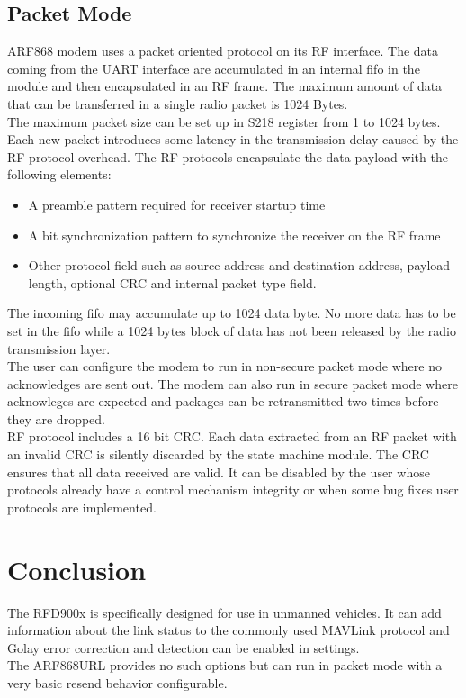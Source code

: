 \subsection{Packet Mode}
ARF868 modem uses a packet oriented protocol on its RF interface. The data coming from the UART interface are accumulated in an internal fifo in the module and then encapsulated in an RF frame. The maximum amount of data that can be transferred in a single radio packet is 1024 Bytes.\\
The maximum packet size can be set up in S218 register from 1 to 1024 bytes. Each new packet introduces some latency in the transmission delay caused by the RF protocol overhead. The RF protocols encapsulate the data payload with the following elements:
\begin{itemize}
    \item  A preamble pattern required for receiver startup time
    \item A bit synchronization pattern to synchronize the receiver on the RF frame
    \item Other protocol field such as source address and destination address, payload length, optional CRC and internal packet type field.
\end{itemize}
The incoming fifo may accumulate up to 1024 data byte. No more data has to be set in the fifo while a 1024 bytes block of data has not been released by the radio transmission layer.\\
The user can configure the modem to run in non-secure packet mode where no acknowledges are sent out. The modem can also run in secure packet mode where acknowleges are expected and packages can be retransmitted two times before they are dropped. \\
RF protocol includes a 16 bit CRC. Each data extracted from an RF packet with an invalid CRC is silently discarded by the state machine module. The CRC ensures that all data received are valid. It can be disabled by the user whose protocols already have a control mechanism integrity or when some bug fixes user protocols are implemented.
%
\section{Conclusion}
The RFD900x is specifically designed for use in unmanned vehicles. It can add information about the link status to the commonly used MAVLink protocol and Golay error correction and detection can be enabled in settings.\\
The ARF868URL provides no such options but can run in packet mode with a very basic resend behavior configurable.